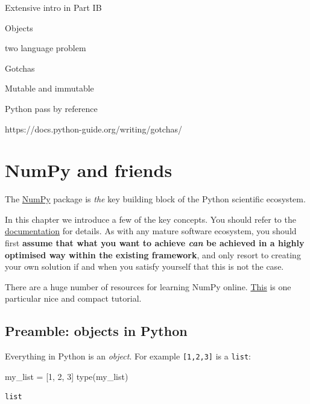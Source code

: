\documentclass[
  letterpaper,
  DIV=11,
  numbers=noendperiod]{scrreprt}
\newenvironment{Shaded}{\begin{snugshade}}{\end{snugshade}}
\newcommand{\BuiltInTok}[1]{\textcolor[rgb]{0.00,0.23,0.31}{#1}}
\newcommand{\DecValTok}[1]{\textcolor[rgb]{0.68,0.00,0.00}{#1}}
\newcommand{\NormalTok}[1]{\textcolor[rgb]{0.00,0.23,0.31}{#1}}
\newcommand{\OperatorTok}[1]{\textcolor[rgb]{0.37,0.37,0.37}{#1}}
\theoremstyle{definition}
\theoremstyle{remark}
\begin{document}
Extensive intro in Part IB

Objects

two language problem

Gotchas

Mutable and immutable

Python pass by reference

https://docs.python-guide.org/writing/gotchas/


\hypertarget{numpy-and-friends}{%
\chapter{NumPy and friends}\label{numpy-and-friends}}

The \href{https://numpy.org/}{NumPy} package is \emph{the} key building
block of the Python scientific ecosystem.

In this chapter we introduce a few of the key concepts. You should refer
to the
\href{https://numpy.org/doc/stable/user/index.html}{documentation} for
details. As with any mature software ecosystem, you should first
\textbf{assume that what you want to achieve \emph{can} be achieved in a
highly optimised way within the existing framework}, and only resort to
creating your own solution if and when you satisfy yourself that this is
not the case.

There are a huge number of resources for learning NumPy online.
\href{https://cs231n.github.io/python-numpy-tutorial/}{This} is one
particular nice and compact tutorial.

\hypertarget{preamble-objects-in-python}{%
\section{Preamble: objects in Python}\label{preamble-objects-in-python}}

Everything in Python is an \emph{object}. For example
\texttt{{[}1,2,3{]}} is a \texttt{list}:

\begin{Shaded}
\begin{Highlighting}[]
\NormalTok{my\_list }\OperatorTok{=}\NormalTok{ [}\DecValTok{1}\NormalTok{, }\DecValTok{2}\NormalTok{, }\DecValTok{3}\NormalTok{]}
\BuiltInTok{type}\NormalTok{(my\_list)}
\end{Highlighting}
\end{Shaded}

\begin{verbatim}
list
\end{verbatim}
\end{document}
